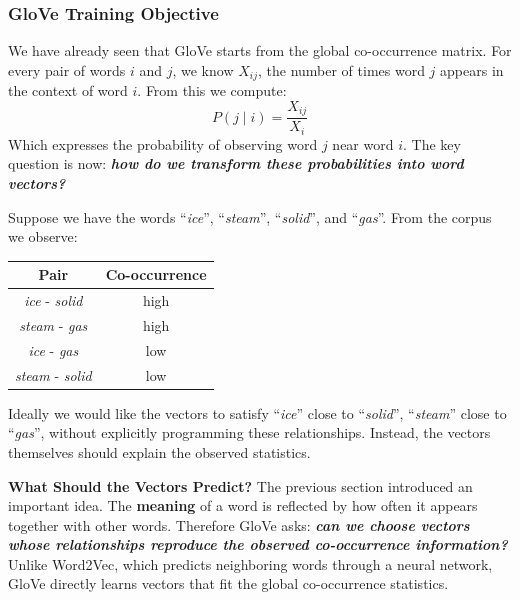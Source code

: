 \subsubsection{GloVe Training Objective}\label{sec:glove-training-objective}

We have already seen that GloVe starts from the global co-occurrence matrix. For every pair of words $i$ and $j$, we know $X_{ij}$, the number of times word $j$ appears in the context of word $i$. From this we compute:
\begin{equation*}
    P\left(j \mid i\right) = \frac{X_{ij}}{X_i}
\end{equation*}
Which expresses the probability of observing word $j$ near word $i$. The key question is now: \emph{\textbf{how do we transform these probabilities into word vectors?}}

\highspace
Suppose we have the words ``\emph{ice}'', ``\emph{steam}'', ``\emph{solid}'', and ``\emph{gas}''. From the corpus we observe:
\begin{center}
    \begin{tabular}{@{} c c @{}}
        \toprule
        \textbf{Pair} & \textbf{Co-occurrence} \\
        \midrule
        \emph{ice} - \emph{solid} & high \\
        \emph{steam} - \emph{gas} & high \\
        \emph{ice} - \emph{gas} & low \\
        \emph{steam} - \emph{solid} & low \\
        \bottomrule
    \end{tabular}
\end{center}
\noindent
Ideally we would like the vectors to satisfy ``\emph{ice}'' close to ``\emph{solid}'', ``\emph{steam}'' close to ``\emph{gas}'', without explicitly programming these relationships. Instead, the vectors themselves should explain the observed statistics.

\highspace
\textcolor{Green3}{ \textbf{What Should the Vectors Predict?}} The previous section introduced an important idea. The \textbf{meaning} of a word is reflected by how often it appears together with other words. Therefore GloVe asks: \emph{\textbf{can we choose vectors whose relationships reproduce the observed co-occurrence information?}} Unlike Word2Vec, which predicts neighboring words through a neural network, GloVe directly learns vectors that fit the global co-occurrence statistics.

